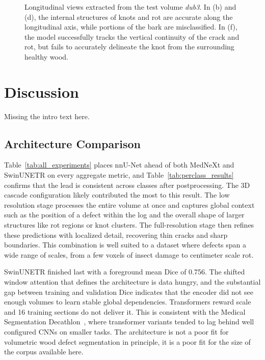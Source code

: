 \begin{figure}[p]
  \caption{Longitudinal views extracted from the test volume \textit{dub3}. In (b) and (d), the internal structures of knots and rot are accurate along the longitudinal axis, while portions of the bark are misclassified. In (f), the model successfully tracks the vertical continuity of the crack and rot, but fails to accurately delineate the knot from the surrounding healthy wood.}
  \label{fig:qualitative_longitudinal}
\end{figure}


\chapter{Discussion}

Missing the intro text here.

\section{Architecture Comparison}

Table~\ref{tab:all_experiments} places nnU-Net ahead of both MedNeXt and SwinUNETR on every aggregate metric, and Table~\ref{tab:perclass_results} confirms that the lead is consistent across classes after postprocessing. The 3D cascade configuration likely contributed the most to this result. The low resolution stage processes the entire volume at once and captures global context such as the position of a defect within the log and the overall shape of larger structures like rot regions or knot clusters. The full-resolution stage then refines these predictions with localized detail, recovering thin cracks and sharp boundaries. This combination is well suited to a dataset where defects span a wide range of scales, from a few voxels of insect damage to centimeter scale rot.

SwinUNETR finished last with a foreground mean Dice of 0.756. The shifted window attention that defines the architecture is data hungry, and the substantial gap between training and validation Dice indicates that the encoder did not see enough volumes to learn stable global dependencies. Transformers reward scale and 16 training sections do not deliver it. This is consistent with the Medical Segmentation Decathlon~\cite{antonelli2022msd}, where transformer variants tended to lag behind well configured CNNs on smaller tasks. The architecture is not a poor fit for volumetric wood defect segmentation in principle, it is a poor fit for the size of the corpus available here.

